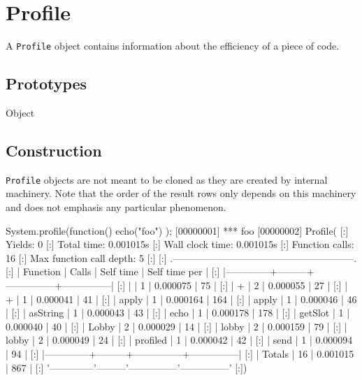 
\section{Profile}

A \lstinline|Profile| object contains information about the efficiency of a
piece of code.

\subsection{Prototypes}

\begin{refObjects}
\item[Object]
\end{refObjects}

\subsection{Construction}

\lstinline|Profile| objects are not meant to be cloned as they are created
by  internal machinery. Note that the order of the
result rows only depends on this machinery and does not emphasis
any particular phenomenon.

\begin{urbiscript}
System.profile(function() { echo("foo") });
[00000001] *** foo
[00000002] Profile(
[:]  Yields: 0
[:]  Total time: 0.001015s
[:]  Wall clock time: 0.001015s
[:]  Function calls: 16
[:]  Max function call depth: 5
[:]
[:]  .--------------------------------------------------------.
[:]  |   Function   |  Calls  |   Self time   | Self time per |
[:]  |--------------+---------+---------------+---------------|
[:]  |              |       1 |      0.000075 |            75 |
[:]  |            + |       2 |      0.000055 |            27 |
[:]  |            + |       1 |      0.000041 |            41 |
[:]  |        apply |       1 |      0.000164 |           164 |
[:]  |        apply |       1 |      0.000046 |            46 |
[:]  |     asString |       1 |      0.000043 |            43 |
[:]  |         echo |       1 |      0.000178 |           178 |
[:]  |      getSlot |       1 |      0.000040 |            40 |
[:]  |        Lobby |       2 |      0.000029 |            14 |
[:]  |        lobby |       2 |      0.000159 |            79 |
[:]  |        lobby |       2 |      0.000049 |            24 |
[:]  |     profiled |       1 |      0.000042 |            42 |
[:]  |         send |       1 |      0.000094 |            94 |
[:]  |--------------+---------+---------------+---------------|
[:]  |       Totals |      16 |      0.001015 |           867 |
[:]  '--------------'---------'---------------'---------------'
[:])
\end{urbiscript}

